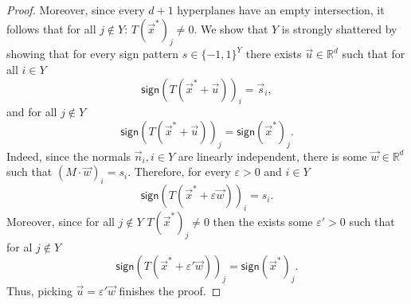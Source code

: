 \documentclass[11pt]{article}
\theoremstyle{definition}
\newcommand{\eps}{\varepsilon}
\newcommand{\1}{\mathbf{1}}
\newcommand{\R}{{\mathbb R}}
\newcommand{\sign}{\mathsf{sign}}
\begin{document}
\begin{appendix}
\begin{proof}
Moreover, since every $d+1$ hyperplanes have an empty intersection,
it follows that for all $j\notin Y$: $T(\vec x^*)_j\neq 0$.
We show that $Y$ is strongly shattered by showing that for every sign pattern
$s\in\{- 1,1\}^Y$ there exists $\vec u\in\R^d$ such that for all $i\in Y$
$$\sign(T(\vec x^*+\vec u))_i = \vec s_i,$$
and for all $j\notin Y$
$$\sign(T(\vec x^*+\vec u))_j = \sign(\vec x^*)_j.$$
Indeed, since the normals $\vec n_i, i\in Y$ are linearly independent,
there is some $\vec w\in\R^d$ such that $(M\cdot\vec w)_i = s_i$.
Therefore, for every $\eps>0$ and $i\in Y$
$$\sign(T(\vec x^*+\eps\vec w))_i = s_i.$$
Moreover, since for all $j\notin Y$ $T(\vec x^*)_j \neq 0$
then the exists some $\eps'>0$ such that for al $j\notin Y$
$$\sign(T(\vec x^*+\eps'\vec w))_j = \sign(\vec x^*)_j.$$
Thus, picking $\vec u=\eps' \vec w$ finishes the proof.
\end{proof}





\end{appendix}
\end{document}
